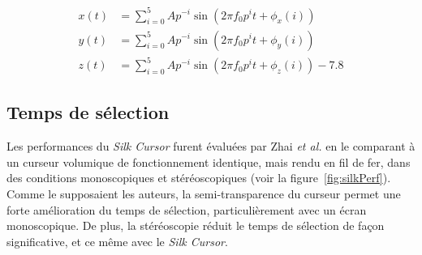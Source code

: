 \begin{appendices}
	\begin{align}
		\label{eq:silkMotion0}
		x(t) &= \sum_{i=0}^{5} Ap^{-i} \sin \left( 2\pi{}f_{0}p^{i}t + \phi_{x}(i) \right) \\
		\label{eq:silkMotion1}
		y(t) &= \sum_{i=0}^{5} Ap^{-i} \sin \left( 2\pi{}f_{0}p^{i}t + \phi_{y}(i) \right) \\
		\label{eq:silkMotion2}
		z(t) &= \sum_{i=0}^{5} Ap^{-i} \sin \left( 2\pi{}f_{0}p^{i}t + \phi_{z}(i) \right) - 7.8
	\end{align}
	
	\subsection{Temps de sélection}
	Les performances du \emph{Silk Cursor} furent évaluées par Zhai \emph{et al.} en le comparant à un curseur volumique de fonctionnement identique, mais rendu en fil de fer, dans des conditions monoscopiques et stéréoscopiques (voir la figure~\ref{fig:silkPerf}). Comme le supposaient les auteurs, la semi-transparence du curseur permet une forte amélioration du temps de sélection, particulièrement avec un écran monoscopique. De plus, la stéréoscopie réduit le temps de sélection de façon significative, et ce même avec le \emph{Silk Cursor}.
	

\end{appendices}
